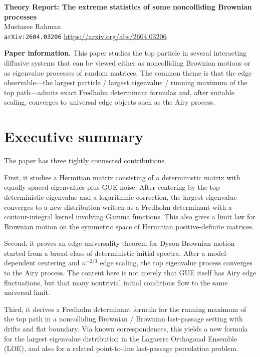 \documentclass[11pt]{article}
\begin{document}
\begin{center}
{\Large \textbf{Theory Report: The extreme statistics of some noncolliding Brownian processes}}\\[0.5em]
{\large Mustazee Rahman}\\[0.25em]
\texttt{arXiv:2604.03206} \quad \url{https://arxiv.org/abs/2604.03206}
\end{center}

\textbf{Paper information.} This paper studies the top particle in several interacting diffusive systems that can be viewed either as noncolliding Brownian motions or as eigenvalue processes of random matrices. The common theme is that the edge observable---the largest particle / largest eigenvalue / running maximum of the top path---admits exact Fredholm determinant formulas and, after suitable scaling, converges to universal edge objects such as the Airy process.

\section*{Executive summary}
The paper has three tightly connected contributions.

First, it studies a Hermitian matrix consisting of a deterministic matrix with equally spaced eigenvalues plus GUE noise. After centering by the top deterministic eigenvalue and a logarithmic correction, the largest eigenvalue converges to a new distribution written as a Fredholm determinant with a contour-integral kernel involving Gamma functions. This also gives a limit law for Brownian motion on the symmetric space of Hermitian positive-definite matrices.

Second, it proves an edge-universality theorem for Dyson Brownian motion started from a broad class of deterministic initial spectra. After a model-dependent centering and $n^{-2/3}$ edge scaling, the top eigenvalue process converges to the Airy process. The content here is not merely that GUE itself has Airy edge fluctuations, but that many nontrivial initial conditions flow to the same universal limit.

Third, it derives a Fredholm determinant formula for the running maximum of the top path in a noncolliding Brownian / Brownian last-passage setting with drifts and flat boundary. Via known correspondences, this yields a new formula for the largest eigenvalue distribution in the Laguerre Orthogonal Ensemble (LOE), and also for a related point-to-line last-passage percolation problem.
\end{document}
